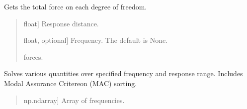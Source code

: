 \documentclass[letterpaper,10pt,english]{sphinxmanual}
\begin{document}
\begin{fulllineitems}
\begin{fulllineitems}
\label{\detokenize{model:pywfe.Model.forces}}
\pysigstartsignatures
{}
\pysigstopsignatures
\sphinxAtStartPar
Gets the total force on each degree of freedom.
\begin{quote}\begin{description}
\begin{description}
\sphinxlineitem{\sphinxstylestrong{x\_r}}{[}float{]}
\sphinxAtStartPar
Response distance.

\sphinxlineitem{\sphinxstylestrong{f}}{[}float, optional{]}
\sphinxAtStartPar
Frequency. The default is None.

\end{description}

\begin{description}
\sphinxAtStartPar
forces.

\end{description}

\end{description}\end{quote}

\end{fulllineitems}


\begin{fulllineitems}
\label{\detokenize{model:pywfe.Model.frequency_sweep}}
\pysigstartsignatures
{}
\pysigstopsignatures
\sphinxAtStartPar
Solves various quantities over specified frequency and response range.
Includes Modal Assurance Critereon (MAC) sorting.
\begin{quote}\begin{description}
\begin{description}
\sphinxlineitem{\sphinxstylestrong{f\_arr}}{[}np.ndarray{]}
\sphinxAtStartPar
Array of frequencies.


\end{description}
\end{description}
\end{quote}
\end{fulllineitems}
\end{fulllineitems}
\end{document}

